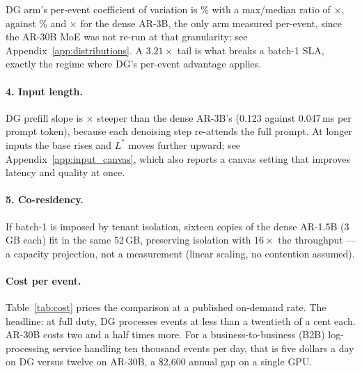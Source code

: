 DG arm's per-event coefficient of variation is \dgEventCV\%
with a max/median ratio of \dgMaxMed$\times$, against
\arEventCV\% and \arMaxMed$\times$ for the dense AR-3B, the only arm
measured per-event, since the AR-30B MoE was not re-run at that
granularity; see Appendix~\ref{app:distributions}.
A $3.21\times$ tail is what breaks a batch-1 SLA, exactly the
regime where DG's per-event advantage applies.

\paragraph{4. Input length.}

DG prefill slope is $\times$ steeper than
the dense AR-3B's (0.123 against 0.047\,ms per prompt token), because
each denoising step re-attends the full prompt. At
longer inputs the base rises and $L^{*}$ moves further upward; see
Appendix~\ref{app:input_canvas}, which also reports a canvas setting
that improves latency and quality at once.

\paragraph{5. Co-residency.}

If batch-1 is imposed by tenant isolation, sixteen copies of the
dense AR-1.5B (3\,GB each) fit in the same 52\,GB, preserving
isolation with $16\times$ the throughput --- a capacity projection,
not a measurement (linear scaling, no contention assumed).

\paragraph{Cost per event.}

Table~\ref{tab:cost} prices the comparison at a published on-demand
rate. The headline: at full duty, DG processes events at less than a
twentieth of a cent each. AR-30B costs two and a half times more. For a
business-to-business (B2B) log-processing service handling ten
thousand events per day, that is five dollars a day on DG versus
twelve on AR-30B, a \$2{,}600 annual gap on a single GPU.


